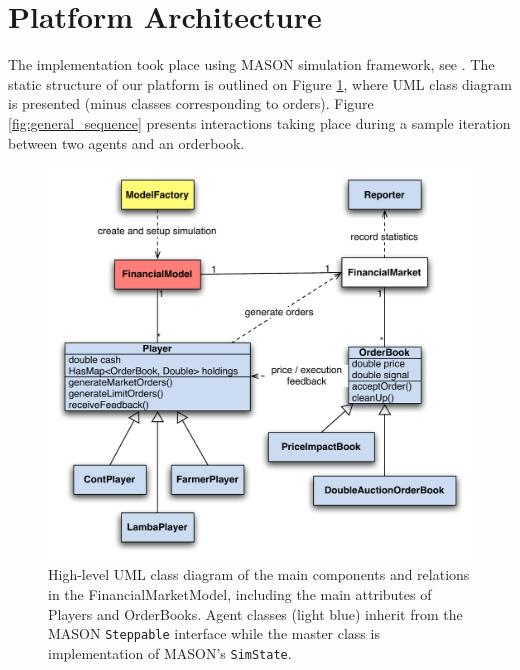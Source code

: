 \documentclass[runningheads]{llncs}
\begin{document}
\section{Platform Architecture}

The implementation took place using MASON simulation framework, see \cite{luke2005}. The static structure of our platform is outlined on Figure \ref{fig:general_class}, where UML class diagram is presented (minus classes corresponding to orders). Figure \ref{fig:general_sequence} presents interactions taking place during a sample iteration between two agents and an orderbook.  

\begin{figure}[htb]
\centering
\includegraphics[width=1.0\textwidth]{../graphics/masterClassDiagram.pdf}
\caption{High-level UML class diagram of the main components and relations in the FinancialMarketModel, including the main attributes of Players and OrderBooks. Agent classes (light blue) inherit from the MASON \texttt{Steppable} interface while the master class is implementation of MASON's \texttt{SimState}.}
\label{fig:general_class}
\end{figure}
\end{document}
